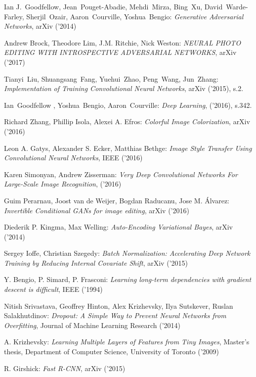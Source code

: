 \begin{thebibliography}{99} %

   Ian J.~Goodfellow, Jean~Pouget-Abadie, Mehdi~Mirza, Bing~Xu, David~Warde-Farley, Sherjil~Ozair, Aaron~Courville, Yoshua~Bengio:
  \emph{Generative Adversarial Networks}, arXiv ('2014)

   Andrew Brock, Theodore Lim, J.M. Ritchie,
  Nick Weston:
  \emph{NEURAL PHOTO EDITING WITH INTROSPECTIVE ADVERSARIAL NETWORKS}, arXiv ('2017)

   Tianyi~Liu, Shuangsang~Fang, Yuehui~Zhao, Peng~Wang, Jun~Zhang:
  \emph{Implementation of Training Convolutional Neural Networks}, arXiv ('2015), s.2.

   Ian~Goodfellow ,  Yoshua~Bengio, Aaron~Courville:
  \emph{Deep Learning}, ('2016), s.342.

   Richard Zhang, Phillip Isola, Alexei A. Efros:
  \emph{Colorful Image Colorization}, arXiv ('2016)

   Leon A. Gatys, Alexander S. Ecker, Matthias Bethge:
  \emph{Image Style Transfer Using Convolutional Neural Networks}, IEEE ('2016)

   Karen Simonyan, Andrew Zisserman:
  \emph{Very Deep Convolutional Networks For Large-Scale Image Recognition}, ('2016)

   Guim Perarnau, Joost van de Weijer, Bogdan Raducanu, Jose M. Álvarez:
  \emph{Invertible Conditional GANs for image editing}, arXiv ('2016)

   Diederik P. Kingma, Max Welling:
  \emph{Auto-Encoding Variational Bayes}, arXiv ('2014)

   Sergey Ioffe, Christian Szegedy:
  \emph{Batch Normalization: Accelerating Deep Network Training by Reducing
  Internal Covariate Shift}, arXiv ('2015)

   Y. Bengio, P. Simard, P. Frasconi:
  \emph{Learning long-term dependencies with gradient descent is difficult},
  IEEE ('1994)

   Nitish Srivastava, Geoffrey Hinton, Alex Krizhevsky,
  Ilya Sutskever, Ruslan Salakhutdinov:
  \emph{Dropout: A Simple Way to Prevent Neural Networks from Overfitting},
  Journal of Machine Learning Research ('2014)

   A. Krizhevsky:
  \emph{Learning Multiple Layers of Features from Tiny Images},
  Master’s thesis, Department of Computer Science, University of Toronto ('2009)

   R. Girshick:
  \emph{Fast R-CNN},
  arXiv ('2015)

\end{thebibliography}

